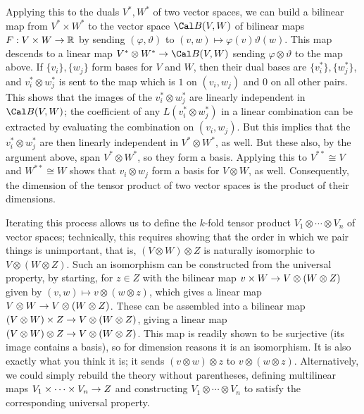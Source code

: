 Applying this to the duals $V^*,W^*$ of two vector
spaces, we can build a bilinear map from $V^*\times W^*$ to 
the vector space ${\Cal B}(V,W)$ of bilinear maps $F:V\times W\rightarrow {\Bbb R}$
by sending $(\varphi,\vartheta)$ to $(v,w)\mapsto \varphi(v)\vartheta(w)$.
This map descends to a linear map $V^*\otimes W^*\ra {\Cal B}(V,W)$
sending $\varphi\otimes\vartheta$ to the map above. If
$\{v_i\},\{w_j\}$ form bases for $V$ and $W$, then their dual bases
are $\{v_i^*\},\{w_j^*\}$, and $v_i^*\otimes w_j^*$ is sent to
the map which is $1$ on $(v_i,w_j)$ and $0$ on all other pairs.
This shows that the images of the $v_i^*\otimes w_j^*$ are
linearly independent in ${\Cal B}(V,W)$; the coefficient of any
$L(v_i^*\otimes w_j^*)$ in a linear combination can be extracted
by evaluating the combination on $(v_i,w_j)$. But this implies
that the $v_i^*\otimes w_j^*$ are then linearly independent in 
$V^*\otimes W^*$, as well. But these also, by the argument above,
span $V^*\otimes W^*$, so they form a basis. Applying this to 
$V^{**}\cong V$ and $W^{**}\cong W$ shows that $v_i\otimes w_j$
form a basis for $V\otimes W$, as well. Consequently, the 
dimension of the tensor product of two vector spaces is the product of their
dimensions.

\msk

Iterating this process allows us to define the $k$-fold tensor product
$V_1\otimes \cdots\otimes V_n$ of vector spaces; technically, this requires
showing that the order in which we pair things is unimportant, that is,
$(V\otimes W)\otimes Z$ is naturally isomorphic to $V\otimes (W\otimes Z)$.
Such an isomorphism can be constructed from the universal property, by
starting, for $z\in Z$ with the bilinear map $v\times W\rightarrow V\otimes (W\otimes Z)$
given by $(v,w)\mapsto v\otimes(w\otimes z)$, which gives a linear map
$V\otimes W\rightarrow V\otimes (W\otimes Z)$. These can be assembled into a
bilinear map $(V\otimes W)\times Z\rightarrow V\otimes (W\otimes Z)$, giving
a linear map $(V\otimes W)\otimes Z\rightarrow V\otimes (W\otimes Z)$. This map 
is readily shown to be surjective (its image contains a basis), so for
dimension reasons it is an isomorphism. It is also exactly what you think it is;
it sends $(v\otimes w)\otimes z$ to $v\otimes(w\otimes z)$. Alternatively, 
we could simply
rebuild the theory without parentheses, defining multilinear maps
$V_1\times \cdots \times V_n\rightarrow Z$ and constructing $V_1\otimes\cdots\otimes V_n$
to satisfy the corresponding universal property.

\ssk

